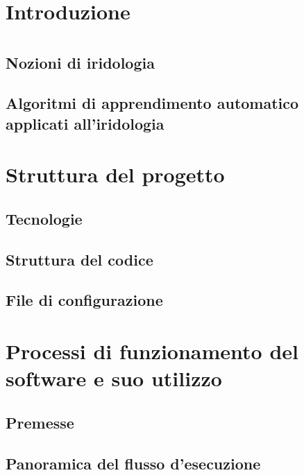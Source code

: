 \documentclass[12pt,twoside,openright]{report}
\begin{document}
  \shipout\null  

  
  
  \tableofcontents
  
  \chapter{Introduzione}
  
  
  
  \chapter{}
  \section{Nozioni di iridologia}
    
  \section{Algoritmi di apprendimento automatico applicati all'iridologia}
  
  
  \chapter{Struttura del progetto}
  \section{Tecnologie}
  
  \section{Struttura del codice}
  
  \section{File di configurazione}
  
    
  \chapter{Processi di funzionamento del software e suo utilizzo}
  \section{Premesse}
  
  \section{Panoramica del flusso d'esecuzione}
  
  
\end{document}
